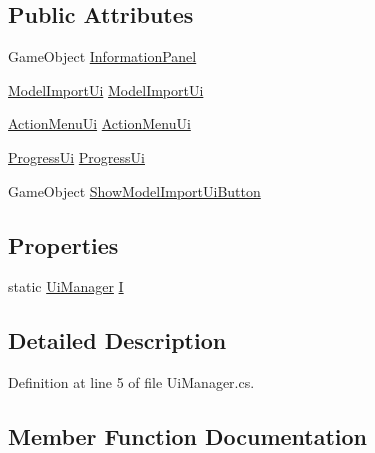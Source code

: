 \subsection*{Public Attributes}
\begin{DoxyCompactItemize}
\item 
Game\+Object \mbox{\hyperlink{class_ui_manager_adcd30c5a43465bae39f7dde94cbb5c11}{Information\+Panel}}
\item 
\mbox{\hyperlink{class_model_import_ui}{Model\+Import\+Ui}} \mbox{\hyperlink{class_ui_manager_a2bb024cf54acc9d7aae98b2260a10471}{Model\+Import\+Ui}}
\item 
\mbox{\hyperlink{class_action_menu_ui}{Action\+Menu\+Ui}} \mbox{\hyperlink{class_ui_manager_a3afdba4b0bc234226776a09b30347b37}{Action\+Menu\+Ui}}
\item 
\mbox{\hyperlink{class_progress_ui}{Progress\+Ui}} \mbox{\hyperlink{class_ui_manager_a3bfed40246705bc1cb9d1611200e5064}{Progress\+Ui}}
\item 
Game\+Object \mbox{\hyperlink{class_ui_manager_a95546a510c301fc66886b8547799f979}{Show\+Model\+Import\+Ui\+Button}}
\end{DoxyCompactItemize}
\subsection*{Properties}
\begin{DoxyCompactItemize}
\item 
static \mbox{\hyperlink{class_ui_manager}{Ui\+Manager}} \mbox{\hyperlink{class_ui_manager_a26e1bd8ac1902121819f42a097f7f93b}{I}}
\end{DoxyCompactItemize}


\subsection{Detailed Description}


Definition at line 5 of file Ui\+Manager.\+cs.



\subsection{Member Function Documentation}
\mbox{\label{class_ui_manager_a55a912344d1a6881b8107492ea3483a1}} 
